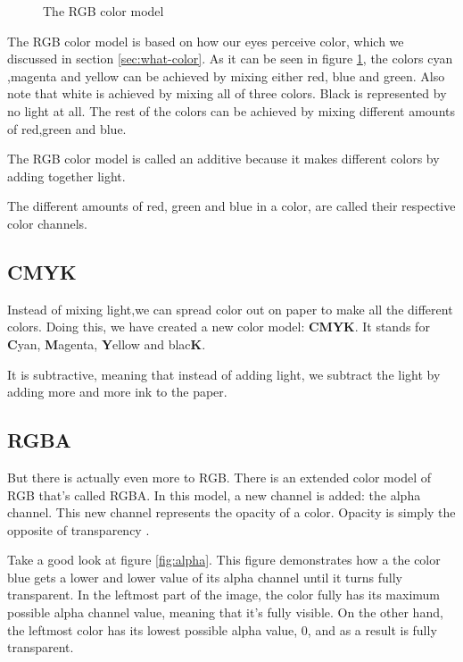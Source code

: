   \begin{figure}
    \centering
    \caption{The RGB color model}
    \label{fig:rgb}
  \end{figure}

  The RGB color model is based on how our eyes perceive color, which
  we discussed in section \ref{sec:what-color}. As it can be seen in
  figure \ref{fig:rgb}, the colors cyan ,magenta and yellow can be
  achieved by mixing either red, blue and green. Also note that white
  is achieved by mixing all of three colors. Black is represented by
  no light at all. The rest of the colors can be achieved by mixing
  different amounts of red,green and blue.

  The RGB color model is called an additive
  because it makes different colors by adding together light.

  The different amounts of red, green and blue in a color, are called
  their respective color channels.

  \subsection{CMYK}
  \label{sec:cmyk}

  Instead of mixing light,we can spread color out on paper to make all
  the different colors. Doing this, we have created a new color model:
  \textbf{CMYK}. It stands for \textbf{C}yan,
  \textbf{M}agenta, \textbf{Y}ellow and blac\textbf{K}.

  It is subtractive, meaning that
  instead of adding light, we subtract the light by adding more and
  more ink to the paper.

  \subsection{RGBA}

  But there is actually even more to RGB. There is an extended color
  model of RGB that's called RGBA. In this model, a new channel is
  added: the alpha channel. This new channel
  represents the opacity of a color. Opacity is simply the opposite of
  transparency \cite{porter84_compos_dig_img}.

  Take a good look at figure \ref{fig:alpha}. This figure demonstrates
  how a the color blue gets a lower and lower value of its alpha
  channel until it turns fully transparent. In the leftmost part of
  the image, the color fully has its maximum possible alpha channel
  value, meaning that it's fully visible. On the other hand, the
  leftmost color has its lowest possible alpha value, $0$, and as a
  result is fully transparent.

